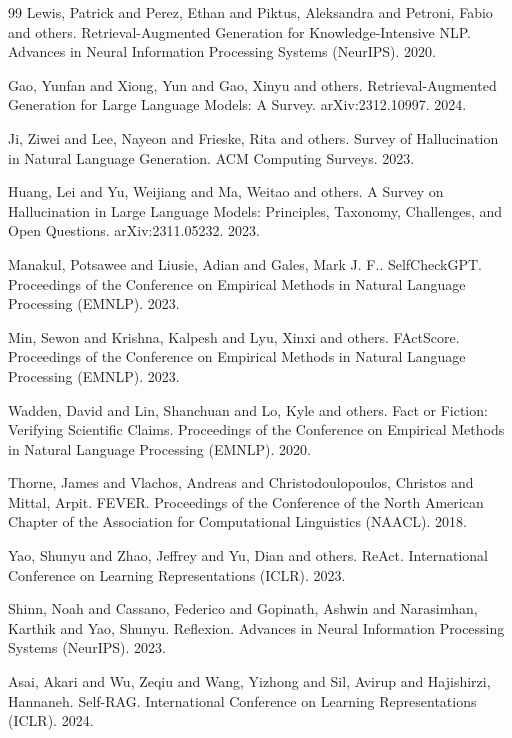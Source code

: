 \begin{thebibliography}{99}
Lewis, Patrick and Perez, Ethan and Piktus, Aleksandra and Petroni, Fabio and others. Retrieval-Augmented Generation for Knowledge-Intensive NLP. Advances in Neural Information Processing Systems (NeurIPS). 2020.

Gao, Yunfan and Xiong, Yun and Gao, Xinyu and others. Retrieval-Augmented Generation for Large Language Models: A Survey. arXiv:2312.10997. 2024.

Ji, Ziwei and Lee, Nayeon and Frieske, Rita and others. Survey of Hallucination in Natural Language Generation. ACM Computing Surveys. 2023.

Huang, Lei and Yu, Weijiang and Ma, Weitao and others. A Survey on Hallucination in Large Language Models: Principles, Taxonomy, Challenges, and Open Questions. arXiv:2311.05232. 2023.

Manakul, Potsawee and Liusie, Adian and Gales, Mark J. F.. SelfCheckGPT. Proceedings of the Conference on Empirical Methods in Natural Language Processing (EMNLP). 2023.

Min, Sewon and Krishna, Kalpesh and Lyu, Xinxi and others. FActScore. Proceedings of the Conference on Empirical Methods in Natural Language Processing (EMNLP). 2023.

Wadden, David and Lin, Shanchuan and Lo, Kyle and others. Fact or Fiction: Verifying Scientific Claims. Proceedings of the Conference on Empirical Methods in Natural Language Processing (EMNLP). 2020.

Thorne, James and Vlachos, Andreas and Christodoulopoulos, Christos and Mittal, Arpit. FEVER. Proceedings of the Conference of the North American Chapter of the Association for Computational Linguistics (NAACL). 2018.

Yao, Shunyu and Zhao, Jeffrey and Yu, Dian and others. ReAct. International Conference on Learning Representations (ICLR). 2023.

Shinn, Noah and Cassano, Federico and Gopinath, Ashwin and Narasimhan, Karthik and Yao, Shunyu. Reflexion. Advances in Neural Information Processing Systems (NeurIPS). 2023.

Asai, Akari and Wu, Zeqiu and Wang, Yizhong and Sil, Avirup and Hajishirzi, Hannaneh. Self-RAG. International Conference on Learning Representations (ICLR). 2024.


\end{thebibliography}
